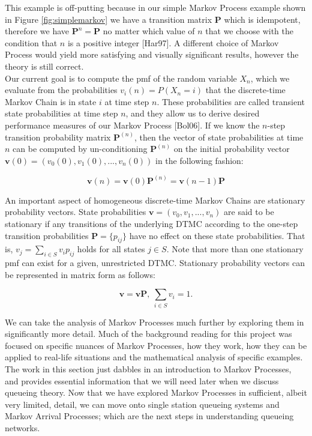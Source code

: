 \documentclass[a4paper,11pt,titlepage]{article}
\begin{document}
This example is off-putting because in our simple Markov Process example shown in Figure \ref{fig:simplemarkov} we have a transition matrix $\mathbf{P}$ which is idempotent, therefore we have $\mathbf{P}^n = \mathbf{P}$ no matter which value of $n$ that we choose with the condition that $n$ is a positive integer [Har97]. A different choice of Markov Process would yield more satisfying and visually significant results, however the theory is still correct. \\

Our current goal is to compute the pmf of the random variable $X_n$, which we evaluate from the probabilities $v_i(n)=P(X_n = i)$ that the discrete-time Markov Chain is in state $i$ at time step $n$. These probabilities are called transient state probabilities at time step $n$, and they allow us to derive desired performance measures of our Markov Process [Bol06]. If we know the $n$-step transition probability matrix $\mathbf{P}^{(n)}$, then the vector of state probabilities at time $n$ can be computed by un-conditioning $\mathbf{P}^{(n)}$ on the initial probability vector $\mathbf{v}(0) = (v_0(0), v_1(0),...,v_n(0))$ in the following fashion: 

\begin{equation}
    \mathbf{v}(n) = \mathbf{v}(0)\mathbf{P}^{(n)} = \mathbf{v}(n-1) \mathbf{P}
\end{equation}

An important aspect of homogeneous discrete-time Markov Chains are stationary probability vectors. State probabilities $\mathbf{v} = (v_0,v_1,...,v_n)$ are said to be stationary if any transitions of the underlying DTMC according to the one-step transition probabilities $\mathbf{P}=\{p_{ij}\}$ have no effect on these state probabilities. That is, $v_j = \sum_{i \in S} v_i p_{ij}$ holds for all states $j \in S$. Note that more than one stationary pmf can exist for a given, unrestricted DTMC. Stationary probability vectors can be represented in matrix form as follows:

\begin{equation}
    \mathbf{v} = \mathbf{v} \mathbf{P}, \: \sum_{i \in S} v_i = 1.
\end{equation}

We can take the analysis of Markov Processes much further by exploring them in significantly more detail. Much of the background reading for this project was focused on specific nuances of Markov Processes, how they work, how they can be applied to real-life situations and the mathematical analysis of specific examples. The work in this section just dabbles in an introduction to Markov Processes, and provides essential information that we will need later when we discuss queueing theory. Now that we have explored Markov Processes in sufficient, albeit very limited, detail, we can move onto single station queueing systems and Markov Arrival Processes; which are the next steps in understanding queueing networks. 
\end{document}
